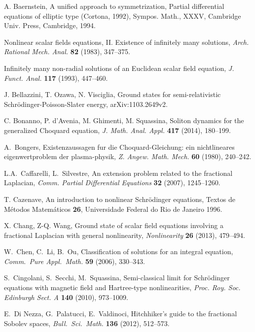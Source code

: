 \documentclass[10pt]{amsart}
\numberwithin{equation}{section}
\begin{document}
\begin{thebibliography}{99}

A. Baernstein, A unified approach to symmetrization, Partial differential equations of elliptic type (Cortona, 1992), 
Sympos. Math., XXXV, Cambridge Univ. Press, Cambridge, 1994.

 
 Nonlinear scalar fields equations, II. Existence of infinitely many solutions, 
{\em Arch. Rational Mech. Anal.} {\bf 82} (1983), 347--375.
 
  Infinitely many non-radial solutions of an Euclidean scalar field equation,
 {\em J. Funct. Anal.} {\bf 117} (1993), 447--460.
 
 
 J. Bellazzini, T. Ozawa, N. Visciglia,
 Ground states for semi-relativistic Schr\"odinger-Poisson-Slater energy,
 arXiv:1103.2649v2. 
 
C. Bonanno, P. d'Avenia, M. Ghimenti, M. Squassina,
Soliton dynamics for the generalized Choquard equation,
{\em J. Math. Anal. Appl.} {\bf 417} (2014), 180--199.

A.\ Bongers, Existenzaussagen fur die Choquard-Gleichung: ein nichtlineares 
eigenwertproblem der plasma-physik, 
{\em Z. Angew. Math. Mech.} {\bf 60} (1980), 240--242.

L.A.\ Caffarelli, L.\ Silvestre,
An extension problem related to the fractional Laplacian,
{\em Comm. Partial Differential Equations} {\bf 32} (2007), 1245--1260.

T. Cazenave, 
An introduction to nonlinear Schr\"odinger equations,
Textos de M\'etodos Matem\'aticos
{\bf 26}, Universidade Federal do Rio de Janeiro 1996.

X. Chang, Z-Q. Wang, 
Ground state of scalar field equations involving a fractional Laplacian with general nonlinearity, 
{\em Nonlinearity} {\bf 26} (2013), 479--494.

W.\ Chen, C.\ Li,  B.\ Ou,  
Classification of solutions for an integral equation,
{\em Comm.\ Pure Appl.\ Math.} {\bf 59} (2006), 330--343.

S.~Cingolani, S.~Secchi, M.~Squassina,
Semi-classical limit for Schr\"odinger equations with magnetic field and Hartree-type nonlinearities,
{\em Proc. Roy. Soc. Edinburgh Sect. A} {\bf 140} (2010), 973--1009.

E.\ Di Nezza, G.\ Palatucci, E.\ Valdinoci,
Hitchhiker's guide to the fractional Sobolev spaces,
\emph{Bull.\ Sci.\ Math.} \textbf{136} (2012), 512--573.


\end{thebibliography}
\end{document}
